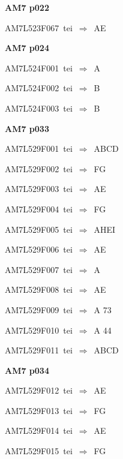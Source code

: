 \par\vfill\eject
{\bf\hfill AM7 p022\hfill\hbox{}}\par\bigskip
{\sixrm AM7L523F067\ {\sixit tei}\ }$\Rightarrow$\ AE\par\smallskip

\par\vfill\eject
{\bf\hfill AM7 p024\hfill\hbox{}}\par\bigskip
{\sixrm AM7L524F001\ {\sixit tei}\ }$\Rightarrow$\ A\par\smallskip
{\sixrm AM7L524F002\ {\sixit tei}\ }$\Rightarrow$\ B\par\smallskip
{\sixrm AM7L524F003\ {\sixit tei}\ }$\Rightarrow$\ B\par\smallskip

\par\vfill\eject
{\bf\hfill AM7 p033\hfill\hbox{}}\par\bigskip
{\sixrm AM7L529F001\ {\sixit tei}\ }$\Rightarrow$\ ABCD\par\smallskip
{\sixrm AM7L529F002\ {\sixit tei}\ }$\Rightarrow$\ FG\par\smallskip
{\sixrm AM7L529F003\ {\sixit tei}\ }$\Rightarrow$\ AE\par\smallskip
{\sixrm AM7L529F004\ {\sixit tei}\ }$\Rightarrow$\ FG\par\smallskip
{\sixrm AM7L529F005\ {\sixit tei}\ }$\Rightarrow$\ AHEI\par\smallskip
{\sixrm AM7L529F006\ {\sixit tei}\ }$\Rightarrow$\ AE\par\smallskip
{\sixrm AM7L529F007\ {\sixit tei}\ }$\Rightarrow$\ A\par\smallskip
{\sixrm AM7L529F008\ {\sixit tei}\ }$\Rightarrow$\ AE\par\smallskip
{\sixrm AM7L529F009\ {\sixit tei}\ }$\Rightarrow$\ A 73\par\smallskip
{\sixrm AM7L529F010\ {\sixit tei}\ }$\Rightarrow$\ A 44\par\smallskip
{\sixrm AM7L529F011\ {\sixit tei}\ }$\Rightarrow$\ ABCD\par\smallskip

\par\vfill\eject
{\bf\hfill AM7 p034\hfill\hbox{}}\par\bigskip
{\sixrm AM7L529F012\ {\sixit tei}\ }$\Rightarrow$\ AE\par\smallskip
{\sixrm AM7L529F013\ {\sixit tei}\ }$\Rightarrow$\ FG\par\smallskip
{\sixrm AM7L529F014\ {\sixit tei}\ }$\Rightarrow$\ AE\par\smallskip
{\sixrm AM7L529F015\ {\sixit tei}\ }$\Rightarrow$\ FG\par\smallskip

